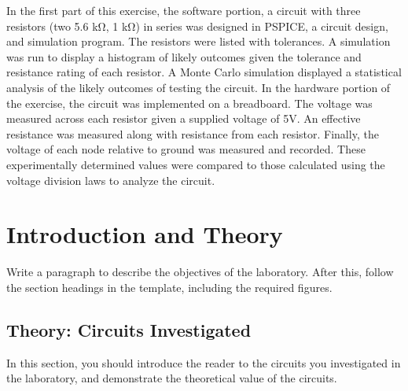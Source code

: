 \documentclass[11pt]{article}
\begin{document}
In the first part of this exercise, the software portion, a circuit with three resistors (two 5.6 k\si{\ohm}, 1 k\si{\ohm}) in series was designed in PSPICE, a circuit design, and simulation program. The resistors were listed with tolerances. A simulation was run to display a histogram of likely outcomes given the tolerance and resistance rating of each resistor. A Monte Carlo simulation displayed a statistical analysis of the likely outcomes of testing the circuit. In the hardware portion of the exercise, the circuit was implemented on a breadboard. The voltage was measured across each resistor given a supplied voltage of 5V. An effective resistance was measured along with resistance from each resistor. Finally, the voltage of each node relative to ground was measured and recorded. These experimentally determined values were compared to those calculated using the voltage division laws to analyze the circuit.

\section {Introduction and Theory}

Write a paragraph to describe the objectives of the laboratory.  After this, follow the section headings in the template, including the required figures.

\subsection{Theory: Circuits Investigated}

In this section, you should introduce the reader to the circuits you investigated in the laboratory, and demonstrate the theoretical value of the circuits. 
\end{document}
